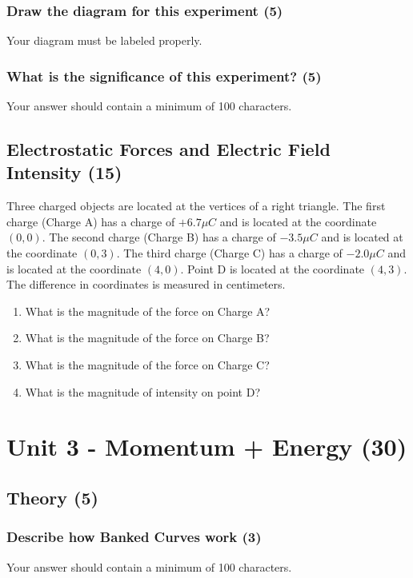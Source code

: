 \documentclass{article}
\begin{document}
\subsubsection{Draw the diagram for this experiment (5)}
Your diagram must be labeled properly.

\subsubsection{What is the significance of this experiment? (5)}
Your answer should contain a minimum of 100 characters.

\subsection{Electrostatic Forces and Electric Field Intensity (15)}
Three charged objects are located at the vertices of a right triangle. The first charge (Charge A) has a charge of $+6.7\mu C$ and is located at the coordinate $(0, 0)$. The second charge (Charge B) has a charge of $-3.5\mu C$ and is located at the coordinate $(0, 3)$. The third charge (Charge C) has a charge of $-2.0\mu C$ and is located at the coordinate $(4, 0)$. Point D is located at the coordinate $(4, 3)$. The difference in coordinates is measured in centimeters.
\begin{enumerate}[label=\alph*)]
    \item What is the magnitude of the force on Charge A?
    \item What is the magnitude of the force on Charge B?
    \item What is the magnitude of the force on Charge C?
    \item What is the magnitude of intensity on point D?
\end{enumerate}



\section{Unit 3 - Momentum + Energy (30)}
\subsection{Theory (5)}
\subsubsection{Describe how Banked Curves work (3)}
Your answer should contain a minimum of 100 characters.
\end{document}

